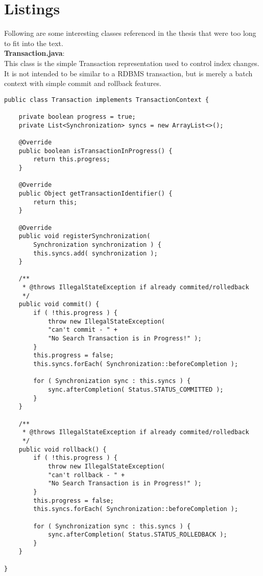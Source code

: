 \pagebreak

\section*{Listings}

Following are some interesting classes referenced in the thesis that were too long to fit into the text.
\\

\noindent
\textbf{Transaction.java}:\\
This class is the simple Transaction representation used to control index changes. It is not intended to be similar to a RDBMS transaction, but is merely a batch context with simple commit and rollback features.
\\
\lstset{language=java}
\begin{lstlisting}[frame=htrbl, caption={the simple Transaction contract}, label={lst:Transaction.java}]
public class Transaction implements TransactionContext {

	private boolean progress = true;
	private List<Synchronization> syncs = new ArrayList<>();
	
	@Override
	public boolean isTransactionInProgress() {
		return this.progress;
	}
	
	@Override
	public Object getTransactionIdentifier() {
		return this;
	}
	
	@Override
	public void registerSynchronization(
		Synchronization synchronization ) {
		this.syncs.add( synchronization );
	}
	
	/**
	 * @throws IllegalStateException if already commited/rolledback
	 */
	public void commit() {
		if ( !this.progress ) {
			throw new IllegalStateException( 
			"can't commit - " + 
			"No Search Transaction is in Progress!" );
		}
		this.progress = false;
		this.syncs.forEach( Synchronization::beforeCompletion );
		
		for ( Synchronization sync : this.syncs ) {
			sync.afterCompletion( Status.STATUS_COMMITTED );
		}
	}
	
	/**
	 * @throws IllegalStateException if already commited/rolledback
 	 */
	public void rollback() {
		if ( !this.progress ) {
			throw new IllegalStateException( 
			"can't rollback - " + 
			"No Search Transaction is in Progress!" );
		}
		this.progress = false;
		this.syncs.forEach( Synchronization::beforeCompletion );
	
		for ( Synchronization sync : this.syncs ) {
			sync.afterCompletion( Status.STATUS_ROLLEDBACK );
		}
	}

}
\end{lstlisting}


